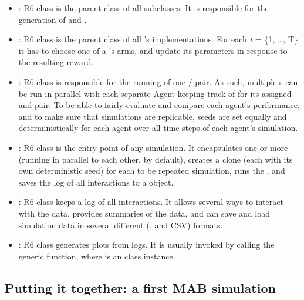 \documentclass{jss}
\begin{document}
\begin{itemize}
         \item {}: R6 class  is the parent class of all   subclasses. It is responsible for the generation of  and .

         \item {}: R6 class  is the parent class of all 's  implementations. For each \emph{t} = \{1, \ldots, T\} it has to choose one of a 's  arms, and update its parameters  in response to the resulting reward.

         \item {}: R6 class  is responsible for the running of one / pair. As such, multiple s can be run in parallel with each separate Agent keeping track of  for its assigned  and  pair. To be able to fairly evaluate and compare each agent's performance, and to make sure that simulations are replicable, seeds are set equally and deterministically for each agent over all  time steps of each agent's simulation.

         \item {}: R6 class  is the entry point of any  simulation. It encapsulates one or more  (running in parallel to each other, by default), creates a clone (each with its own deterministic seed) for each to be repeated simulation, runs the , and saves the log of all  interactions to a  object.

         \item {}: R6 class  keeps a log of all  interactions. It allows several ways to interact with the data, provides summaries of the data, and can save and load simulation data in several different (,  and CSV) formats.

         \item {}: R6 class  generates plots from  logs. It is usually invoked by calling the generic  function, where  is an  class instance.
\end{itemize}

\subsection{Putting it together: a first MAB simulation}
\end{document}
